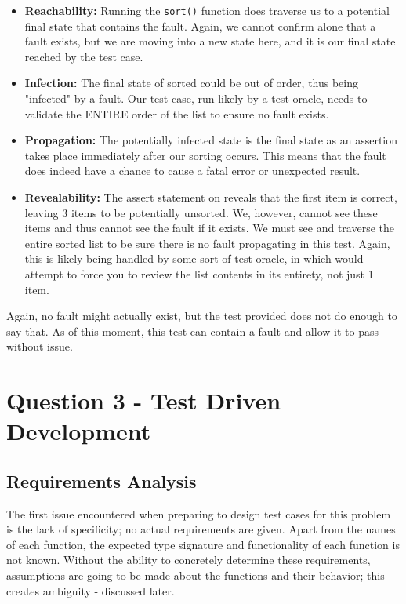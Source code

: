 \documentclass{article}
\begin{document}
\begin{itemize}

    \item \textbf{Reachability:} Running the \texttt{sort()} function
        does traverse us to a potential final state that contains the
        fault. Again, we cannot confirm alone that a fault exists, but
        we are moving into a new state here, and it is our final state
        reached by the test case.
    \item \textbf{Infection:} The final state of sorted could be out
        of order, thus being "infected" by a fault. Our test case, run
        likely by a test oracle, needs to validate the ENTIRE order of
        the list to ensure no fault exists.
    \item \textbf{Propagation:} The potentially infected state is the
        final state as an assertion takes place immediately after our
        sorting occurs. This means that the fault does indeed have a
        chance to cause a fatal error or unexpected result.
    \item \textbf{Revealability:} The assert statement on reveals that
        the first item is correct, leaving 3 items to be potentially
        unsorted. We, however, cannot see these items and thus cannot
        see the fault if it exists. We must see and traverse the
        entire sorted list to be sure there is no fault propagating in
        this test. Again, this is likely being handled by some sort of
        test oracle, in which would attempt to force you to review the
        list contents in its entirety, not just 1 item.

\end{itemize}

Again, no fault might actually exist, but the test provided does not
do enough to say that. As of this moment, this test can contain a
fault and allow it to pass without issue.

\section{Question 3 - Test Driven Development}

\subsection{Requirements Analysis}

The first issue encountered when preparing to design test cases for
this problem is the lack of specificity; no actual requirements are
given. Apart from the names of each function, the expected type
signature and functionality of each function is not known. Without the
ability to concretely determine these requirements, assumptions are
going to be made about the functions and their behavior; this creates
ambiguity - discussed later.
\end{document}
